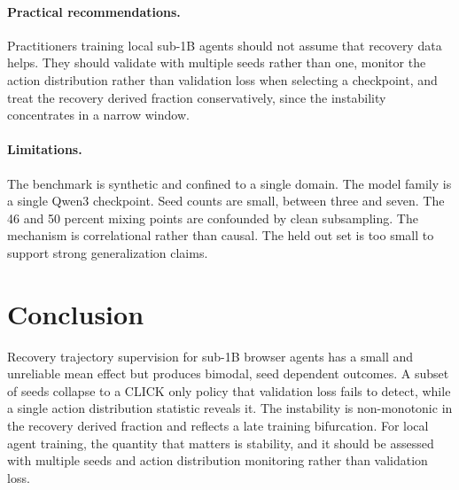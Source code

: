 \documentclass[11pt]{article}
\begin{document}
\paragraph{Practical recommendations.}
Practitioners training local sub-1B agents should not assume that recovery data
helps. They should validate with multiple seeds rather than one, monitor the
action distribution rather than validation loss when selecting a checkpoint, and
treat the recovery derived fraction conservatively, since the instability
concentrates in a narrow window.

\paragraph{Limitations.}
The benchmark is synthetic and confined to a single domain. The model family is
a single Qwen3 checkpoint. Seed counts are small, between three and seven. The
46 and 50 percent mixing points are confounded by clean subsampling. The
mechanism is correlational rather than causal. The held out set is too small to
support strong generalization claims.

\section{Conclusion}
Recovery trajectory supervision for sub-1B browser agents has a small and
unreliable mean effect but produces bimodal, seed dependent outcomes. A subset
of seeds collapse to a CLICK only policy that validation loss fails to detect,
while a single action distribution statistic reveals it. The instability is
non-monotonic in the recovery derived fraction and reflects a late training
bifurcation. For local agent training, the quantity that matters is stability,
and it should be assessed with multiple seeds and action distribution monitoring
rather than validation loss.
\end{document}

